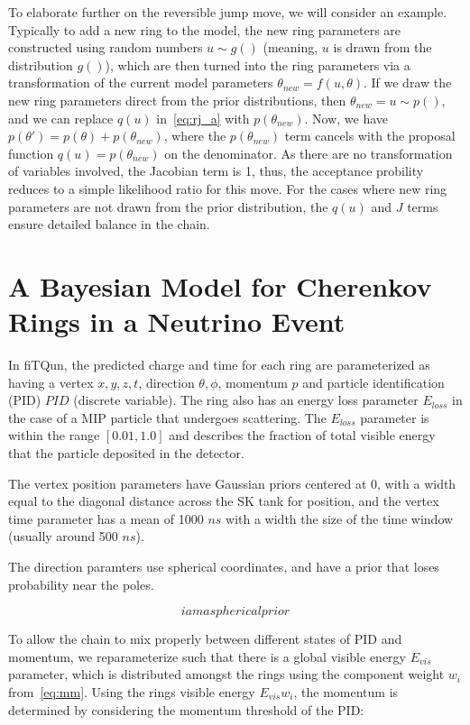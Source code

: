 \documentclass[11pt]{article} %
\begin{document}
To elaborate further on the reversible jump move, we will consider an example. Typically to add a new ring to the model, the new ring parameters are constructed using random numbers $u\sim g()$ (meaning, $u$ is drawn from the distribution $g()$), which are then turned into the ring parameters via a transformation of the current model parameters $\theta_{new} = f(u,\theta)$. If we draw the new ring parameters direct from the prior distributions, then $\theta_{new} = u\sim p()$, and we can replace $q(u)$ in~\ref{eq:rj_a} with $p(\theta_{new})$. Now, we have $p(\theta')=p(\theta)+p(\theta_{new})$, where the $p(\theta_{new})$ term cancels with the proposal function $q(u) = p(\theta_{new})$ on the denominator. As there are no transformation of variables involved, the Jacobian term is 1, thus, the acceptance probility reduces to a simple likelihood ratio for this move. For the cases where new ring parameters are not drawn from the prior distribution, the $q(u)$ and $J$ terms ensure detailed balance in the chain.

\section{A Bayesian Model for Cherenkov Rings in a Neutrino Event}
In fiTQun, the predicted charge and time for each ring are parameterized as having a vertex $x,y,z,t$, direction $\theta,\phi$, momentum $p$ and particle identification (PID) $PID$ (discrete variable). The ring also has an energy loss parameter $E_{loss}$ in the case of a MIP particle that undergoes scattering. The $E_{loss}$ parameter is within the range $[0.01,1.0]$ and describes the fraction of total visible energy that the particle deposited in the detector.

The vertex position parameters have Gaussian priors centered at 0, with a width equal to the diagonal distance across the SK tank for position, and the vertex time parameter has a mean of 1000 $ns$ with a width the size of the time window (usually around 500 $ns$).

The direction paramters use spherical coordinates, and have a prior that loses probability near the poles.

\begin{equation}
i am a spherical prior
\end{equation}

To allow the chain to mix properly between different states of PID and momentum, we reparameterize such that there is a global visible energy $E_{vis}$ parameter, which is distributed amongst the rings using the component weight $w_{i}$ from~\ref{eq:mm}. Using the rings visible energy $E_{vis}w_{i}$, the momentum is determined by considering the momentum threshold of the PID:
\end{document}
